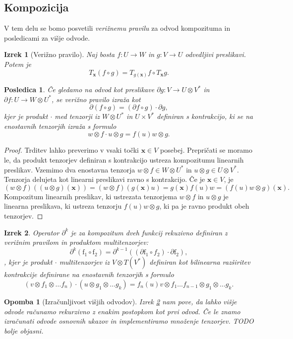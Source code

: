 \documentclass{article}
\newcommand{\x}{\mathbf{x}}
\newcommand{\D}{\partial}
\newtheorem{izrek}{Izrek}[section]
\newtheorem{opomba}{Opomba}[section]
\newtheorem{posledica}{Posledica}[section]
\begin{document}
\subsection{Kompozicija}
V tem delu se bomo posvetili \emph{verižnemu pravilu} za odvod kompozituma in
posledicami za višje odvode.
\begin{izrek}[Verižno pravilo]
  Naj bosta $f:U\to W$ in $g:V\to U$ odvedljivi preslikavi. Potem je 
\[T_\x(f\circ g)=T_{g(\x)}f\circ T_\x g.\]
\end{izrek}
\begin{posledica}
Če gledamo na odvod kot preslikave $\D g:V\to U \otimes V^*$ in $\D f:U\to
W\otimes U^*$, se \emph{verižno pravilo} izraža kot
\[\D(f\circ g) = (\D f\circ g)\cdot \D g,\]
kjer je produkt $\cdot$ med tenzorji iz $W\otimes U^*$ in $U\times V^*$
definiran s kontrakcijo, ki se na enostavnih tenzorjih izraža s formulo
$$w\otimes f\cdot u\otimes g=f(u)w\otimes g.$$
\end{posledica}
\begin{proof}
Trditev lahko preverimo v vsaki točki $\x\in V$ posebej. Prepričati se moramo
le, da produkt tenzorjev definiran s kontrakcijo ustreza kompozitumu linearnih
preslikav. Vzemimo dva enostavna tenzorja $w\otimes f\in W\otimes U^*$ in
$u\otimes g\in U\otimes V^*$. Tenzorja delujeta kot linearni preslikavi ravno s
kontrakcijo. Če je $\x\in V$, je 
\[(w\otimes f)((u\otimes g)(\x))=(w\otimes f)(g(\x)u) = g(\x)f(u)w = (f(u)w
  \otimes g)(\x).\]
 Kompozitum linearnih preslikav, ki ustrezata tenzorjema $w\otimes f$ in
 $u\otimes g$ je linearna preslikava, ki ustreza tenzorju $f(u)w\otimes g$, ki
 pa je ravno produkt obeh tenzorjev.
\end{proof}
 \begin{izrek}\label{izr:D^nRek}
 	Operator $\D^k$ je za kompozitum dveh funkcij rekuzivno definiran z verižnim pravilom in produktom multitenzorjev:
 	$$\D^k(\mathrm{f_1}\circ \mathrm{f_2})=\D^{k-1}((\D \mathrm{f_1}\circ
  f_2)\cdot \D \mathrm{f_2}),$$,
kjer je produkt $\cdot$ multitenzorjev iz $V\otimes T(V^*)$ definiran kot
bilinearna razširitev kontrakcije definirane na enostavnih tenzorjih s formulo
$$(v\otimes f_1\otimes\ldots f_n)\cdot (u\otimes g_1\otimes \ldots
 g_k) = f_n(u)v\otimes f_1\ldots f_{n-1}\otimes g_1\otimes \ldots
 g_k. $$
 \end{izrek}
 \begin{opomba}[Izračunljivost višjih odvodov]
   Izrek \ref{izr:D^nRek} nam pove, da lahko višje odvode računamo rekurzivno z
   enakim postopkom kot prvi odvod. Če le znamo izračunati odvode osnovnih
   ukazov in implementiramo množenje tenzorjev. TODO bolje objasni.
 \end{opomba}
 
\end{document}

